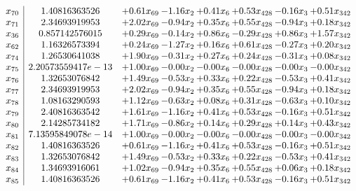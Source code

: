 \documentclass[8pt]{article}
\begin{document}
\[\begin{array}{c| c c@{\hskip 2pt} c@{\hskip 2pt} c@{\hskip 2pt} c@{\hskip 2pt} c@{\hskip 2pt} c@{\hskip 2pt} }
 x_{70}   &  1.40816363526 & +  0.61 x_{69} & -1.16 x_{2} & +  0.41 x_{6} & +  0.53 x_{428} & -0.16 x_{3} & +  0.51 x_{342}\\
 x_{71}   &  2.34693919953 & +  2.02 x_{69} & -0.94 x_{2} & +  0.35 x_{6} & +  0.55 x_{428} & -0.94 x_{3} & +  0.18 x_{342}\\
 x_{36}   &  0.857142576015 & +  0.29 x_{69} & -0.14 x_{2} & +  0.86 x_{6} & -0.29 x_{428} & +  0.86 x_{3} & +  1.57 x_{342}\\
 x_{62}   &  1.16326573394 & +  0.24 x_{69} & -1.27 x_{2} & +  0.16 x_{6} & +  0.61 x_{428} & -0.27 x_{3} & +  0.20 x_{342}\\
 x_{74}   &  1.26530641038 & +  1.90 x_{69} & -0.31 x_{2} & +  0.27 x_{6} & +  0.24 x_{428} & -0.31 x_{3} & +  0.08 x_{342}\\
 x_{75}   &  2.20573559417e-13 & +  1.00 x_{69} & -0.00 x_{2} & -0.00 x_{6} & -0.00 x_{428} & -0.00 x_{3} & -0.00 x_{342}\\
 x_{76}   &  1.32653076842 & +  1.49 x_{69} & -0.53 x_{2} & +  0.33 x_{6} & +  0.22 x_{428} & -0.53 x_{3} & +  0.41 x_{342}\\
 x_{77}   &  2.34693919953 & +  2.02 x_{69} & -0.94 x_{2} & +  0.35 x_{6} & +  0.55 x_{428} & -0.94 x_{3} & +  0.18 x_{342}\\
 x_{78}   &  1.08163290593 & +  1.12 x_{69} & -0.63 x_{2} & +  0.08 x_{6} & +  0.31 x_{428} & -0.63 x_{3} & +  0.10 x_{342}\\
 x_{79}   &  2.40816363542 & +  1.61 x_{69} & -1.16 x_{2} & +  0.41 x_{6} & +  0.53 x_{428} & -0.16 x_{3} & +  0.51 x_{342}\\
 x_{80}   &  2.14285734182 & +  1.71 x_{69} & -0.86 x_{2} & +  0.14 x_{6} & +  0.29 x_{428} & +  0.14 x_{3} & +  0.43 x_{342}\\
 x_{81}   &  7.13595849078e-14 & +  1.00 x_{69} & -0.00 x_{2} & -0.00 x_{6} & -0.00 x_{428} & -0.00 x_{3} & -0.00 x_{342}\\
 x_{82}   &  1.40816363526 & +  0.61 x_{69} & -1.16 x_{2} & +  0.41 x_{6} & +  0.53 x_{428} & -0.16 x_{3} & +  0.51 x_{342}\\
 x_{83}   &  1.32653076842 & +  1.49 x_{69} & -0.53 x_{2} & +  0.33 x_{6} & +  0.22 x_{428} & -0.53 x_{3} & +  0.41 x_{342}\\
 x_{84}   &  1.34693916061 & +  1.02 x_{69} & -0.94 x_{2} & +  0.35 x_{6} & +  0.55 x_{428} & +  0.06 x_{3} & +  0.18 x_{342}\\
 x_{85}   &  1.40816363526 & +  0.61 x_{69} & -1.16 x_{2} & +  0.41 x_{6} & +  0.53 x_{428} & -0.16 x_{3} & +  0.51 x_{342}\\

\end{array}\]
\end{document}
